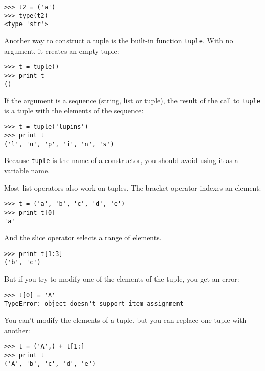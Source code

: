 \beforeverb
\begin{verbatim}
>>> t2 = ('a')
>>> type(t2)
<type 'str'>
\end{verbatim}
\afterverb
%
Another way to construct a tuple is the built-in function {\tt tuple}.
With no argument, it creates an empty tuple:


\beforeverb
\begin{verbatim}
>>> t = tuple()
>>> print t
()
\end{verbatim}
\afterverb
%
If the argument is a sequence (string, list or tuple), the result
of the call to {\tt tuple}
is a tuple with the elements of the sequence:

\beforeverb
\begin{verbatim}
>>> t = tuple('lupins')
>>> print t
('l', 'u', 'p', 'i', 'n', 's')
\end{verbatim}
\afterverb
%
Because {\tt tuple} is the name of a constructor, you should
avoid using it as a variable name.

Most list operators also work on tuples.  The bracket operator
indexes an element:


\beforeverb
\begin{verbatim}
>>> t = ('a', 'b', 'c', 'd', 'e')
>>> print t[0]
'a'
\end{verbatim}
\afterverb
%
And the slice operator selects a range of elements.


\beforeverb
\begin{verbatim}
>>> print t[1:3]
('b', 'c')
\end{verbatim}
\afterverb
%
But if you try to modify one of the elements of the tuple, you get
an error:


\beforeverb
\begin{verbatim}
>>> t[0] = 'A'
TypeError: object doesn't support item assignment
\end{verbatim}
\afterverb
%
You can't modify the elements of a tuple, but you can replace
one tuple with another:

\beforeverb
\begin{verbatim}
>>> t = ('A',) + t[1:]
>>> print t
('A', 'b', 'c', 'd', 'e')
\end{verbatim}
\afterverb
%

